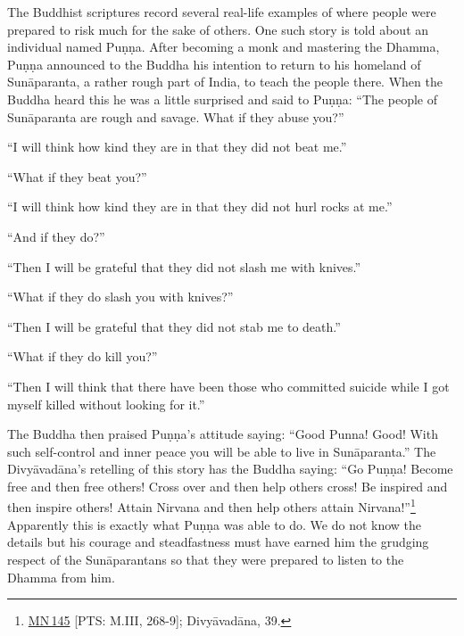 \documentclass[10pt, openright]{book}
\begin{document}
The Buddhist scriptures record several real-life examples of where people were prepared to risk much for the sake of others. One such story is told about an individual named Puṇṇa. After becoming a monk and mastering the Dhamma, Puṇṇa announced to the Buddha his intention to return to his homeland of Sunāparanta, a rather rough part of India, to teach the people there. When the Buddha heard this he was a little surprised and said to Puṇṇa: “The people of Sunāparanta are rough and savage. What if they abuse you?”


“I will think how kind they are in that they did not beat me.”


“What if they beat you?”


“I will think how kind they are in that they did not hurl rocks at me.”


“And if they do?”


“Then I will be grateful that they did not slash me with knives.”


“What if they do slash you with knives?”


“Then I will be grateful that they did not stab me to death.”


“What if they do kill you?”


“Then I will think that there have been those who committed suicide while I got myself killed without looking for it.”


The Buddha then praised Puṇṇa’s attitude saying: “Good Punna! Good! With such self-control and inner peace you will be able to live in Sunāparanta.” The Divyāvadāna’s retelling of this story has the Buddha saying: “Go Puṇṇa! Become free and then free others! Cross over and then help others cross! Be inspired and then inspire others! Attain Nirvana and then help others attain Nirvana!”\footnote {\href{https://suttacentral.net/mn145/en/sujato}{MN 145} [PTS: M.III, 268-9]; Divyāvadāna, 39.} Apparently this is exactly what Puṇṇa was able to do. We do not know the details but his courage and steadfastness must have earned him the grudging respect of the Sunāparantans so that they were prepared to listen to the Dhamma from him.
\end{document}
